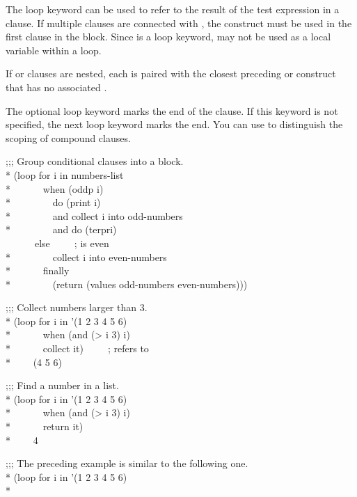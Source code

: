 \begin{new}
\begin{defloop}
The loop keyword  can be used to refer to the result of
the test expression in a clause.  If multiple clauses are connected with ,
the  construct must be used in the first
clause in the block.  Since  is a loop keyword,  may not be used
as a local variable within a loop.

If  or  clauses are nested, each  is
paired with the closest preceding  or  construct that has
no associated .

The optional loop keyword  marks the end of the clause.  If this
keyword is not specified, the next loop keyword marks the end.  You can use
 to distinguish the scoping of compound clauses.
\begin{lisp}
;;; Group conditional clauses into a block. \\*
(loop for i in numbers-list \\*
~~~~~~when (oddp i) \\*
~~~~~~~~do (print i) \\*
~~~~~~~~and collect i into odd-numbers \\*
~~~~~~~~and do (terpri) \\
~~~~~~else~~~~~;{\rm {} is even} \\*
~~~~~~~~collect i into even-numbers \\*
~~~~~~finally \\*
~~~~~~~~(return (values odd-numbers even-numbers)))
\end{lisp}
\begin{lisp}
;;; Collect numbers larger than 3. \\*
(loop for i in '(1 2 3 4 5 6) \\*
~~~~~~when (and (> i 3) i) \\*
~~~~~~collect it)~~~~~;{\rm {} refers to } \\*
~~~\EV~(4 5 6)
\end{lisp}
\begin{lisp}
;;; Find a number in a list. \\*
(loop for i in '(1 2 3 4 5 6) \\*
~~~~~~when (and (> i 3) i) \\*
~~~~~~return it) \\*
~~~\EV~4
\end{lisp}
\begin{lisp}
;;; The preceding example is similar to the following one. \\*
(loop for i in '(1 2 3 4 5 6) \\*

\end{lisp}
\end{defloop}
\end{new}
